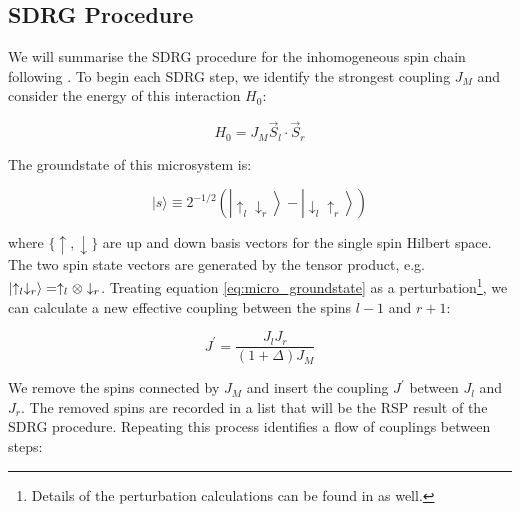 	
\subsection{SDRG Procedure}\label{subsec:sdrg_proc}
We will summarise the SDRG procedure for the inhomogeneous spin chain following \cite{paola2016}. To begin each SDRG step, we identify the strongest coupling $J_M$ and consider the energy of this interaction $H_0$:

\begin{equation}
H_{0}=J_{M} \vec{S}_{l} \cdot \vec{S}_{r}
\end{equation}

The groundstate of this microsystem is: 

\begin{equation}\label{eq:micro_groundstate}
|s\rangle \equiv 2^{-1 / 2}\left(\left|\uparrow_{l} \downarrow_{r}\right\rangle-\left|\downarrow_{l} \uparrow_{r}\right\rangle\right)
\end{equation}

where $\{\uparrow, \downarrow\}$ are up and down basis vectors for the single spin Hilbert space. The two spin state vectors are generated by the tensor product, e.g. $\ket{\uparrow_l \downarrow_r} = \uparrow_l \otimes \downarrow_r$. Treating equation \ref{eq:micro_groundstate} as a perturbation\footnote{Details of the perturbation calculations can be found in \cite{paola2016} as well.}, we can calculate a new effective coupling between the spins $l - 1$ and $r + 1$:

\begin{equation}
J^{\prime}=\frac{J_{l} J_{r}}{(1 + \Delta) J_{M}}
\end{equation}

We remove the spins connected by $J_M$ and insert the coupling $J^\prime$ between $J_l$ and $J_r$. The removed spins are recorded in a list that will be the RSP result of the SDRG procedure. Repeating this process identifies a flow of couplings between steps:

